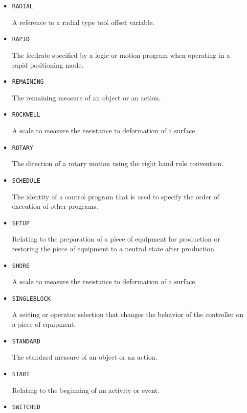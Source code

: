 \begin{itemize}
\item \texttt{RADIAL}  

A reference to a radial type tool offset variable.


\item \texttt{RAPID}  

The feedrate specified by a logic or motion program when operating in a rapid positioning mode.


\item \texttt{REMAINING}  

The remaining measure of an object or an action.


\item \texttt{ROCKWELL}  

A scale to measure the resistance to deformation of a surface.


\item \texttt{ROTARY}  

The direction of a rotary motion using the right hand rule convention.


\item \texttt{SCHEDULE}  

The identity of a control program that is used to specify the order of execution of other programs.


\item \texttt{SET\textunderscore UP}  

Relating to the preparation of a piece of equipment for production or restoring the piece of equipment to a neutral state after production.


\item \texttt{SHORE}  

A scale to measure the resistance to deformation of a surface.


\item \texttt{SINGLE\textunderscore BLOCK}  

A setting or operator selection that changes the behavior of the controller on a piece of equipment. 


\item \texttt{STANDARD}  

The standard measure of an object or an action.


\item \texttt{START}  

Relating to the beginning of an activity or event.


\item \texttt{SWITCHED}  


\end{itemize}
